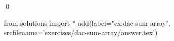 
\begin{ex} 
  \label{ex:dac-sum-array}
  
  \qed
\end{ex} 
\begin{python0}
from solutions import *
add(label="ex:dac-sum-array",
    srcfilename='exercises/dac-sum-array/answer.tex') 
\end{python0}
